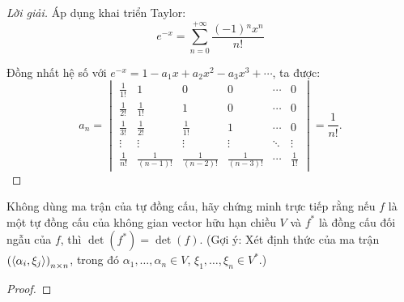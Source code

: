 \documentclass[class=linearalgebra,crop=false]{standalone}
\begin{document}
\begin{proof}[Lời giải]
    \par Áp dụng khai triển Taylor:
    \[
        e^{-x} = \sum^{+\infty}_{n=0}\frac{(-1){}^{n}x^{n}}{n!}
    \]
    \par Đồng nhất hệ số với $e^{-x} = 1 - a_{1}x + a_{2}x^{2} - a_{3}x^{3} + \cdots$, ta được:
    \[
        a_{n} =
        \begin{vmatrix}
            \frac{1}{1!}    & 1                & 0                & 0                & \cdots & 0            \\
            \frac{1}{2!}    & \frac{1}{1!}     & 1                & 0                & \cdots & 0            \\
            \frac{1}{3!}    & \frac{1}{2!}     & \frac{1}{1!}     & 1                & \cdots & 0            \\
            \vdots          & \vdots           & \vdots           & \vdots           & \ddots & \vdots       \\
            \frac{1}{n!}    & \frac{1}{(n-1)!} & \frac{1}{(n-2)!} & \frac{1}{(n-3)!} & \cdots & \frac{1}{1!}
        \end{vmatrix}
        = \frac{1}{n!}.
    \]
\end{proof}

\begin{exercise}
    \par Không dùng ma trận của tự đồng cấu, hãy chứng minh trực tiếp rằng nếu $f$ là một tự đồng cấu của không gian vector hữu hạn chiều $V$ và $f^{*}$ là đồng cấu đối ngẫu của $f$, thì $\det(f^{*}) = \det(f)$. (Gợi ý: Xét định thức của ma trận $\left(\left\langle{\alpha_{i},\xi_{j}}\right\rangle\right)_{n\times n}$, trong đó $\alpha_{1},\ldots,\alpha_{n}\in V$, $\xi_{1},\ldots,\xi_{n}\in V^{*}$.)
\end{exercise}

\begin{proof}
\end{proof}
\end{document}
